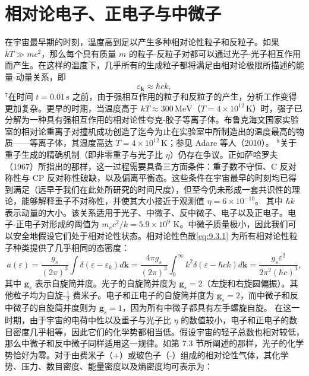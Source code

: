 \section{相对论电子、正电子与中微子}\label{ux76f8ux5bf9ux8bbaux7535ux5b50ux6b63ux7535ux5b50ux4e0eux4e2dux5faeux5b50}
在宇宙最早期的时刻，温度高到足以产生多种相对论性粒子和反粒子。如果 \(kT \gg mc^2\)，那么每个具有质量 \(m\) 的粒子-反粒子对都可以通过光子-光子相互作用而产生。在这样的温度下，几乎所有的生成粒子都将满足由相对论极限所描述的能量-动量关系，即
\begin{equation}\tag{9.3.1}\label{eq:9.3.1}
\varepsilon _ { \mathbf { k } } \approx \hbar c k ,
\end{equation}
\(^{7}\)在时间 \(t=0.01\,\mathrm{s}\) 之前，由于强相互作用的粒子和反粒子的产生，分析工作变得更加复杂。更早的时期，当温度高于 \(kT\approx300\,\mathrm{MeV}\)（\(T=4\times10^{12}\,\mathrm{K}\)）时，强子已分解为一种具有强相互作用的相对论性夸克-胶子等离子体。布鲁克海文国家实验室的相对论重离子对撞机成功创造了迄今为止在实验室中所制造出的温度最高的物质——等离子体，其温度高达 \(T=4\times10^{12}\,\mathrm{K}\)；参见 Adare 等人（2010）。
\(^{8}\)关于重子生成的精确机制（即非零重子与光子比 \(\eta\)）仍存在争议。正如萨哈罗夫（1967）所指出的那样，这一过程需要具备三方面条件：重子数不守恒、C 反对称性与 CP 反对称性破缺，以及偏离平衡态。这些条件在宇宙最早的时刻均已得到满足（远早于我们在此处所研究的时间尺度），但至今仍未形成一套共识性的理论，能够解释重子不对称性，并使其大小接近于观测值 \(\eta=6\times10^{-10}\)。
其中 \(\hbar k\) 表示动量的大小。该关系适用于光子、中微子、反中微子、电子以及正电子。电子-正电子对形成的阈值为 \(m_{e}c^{2}/k=5.9\times10^{9}\) K。中微子质量极小，因此我们可以安全地假设它们处于相对论性状态。相对论性色散\autoref{eq:9.3.1} 为所有相对论性粒子种类提供了几乎相同的态密度：
\begin{equation}\tag{9.3.2}\label{eq:9.3.2}
a ( \varepsilon ) = \frac { g _ { s } } { ( 2 \pi ) ^{3} } \int \delta ( \varepsilon - \varepsilon _ { k } ) d \mathbf { k } = \frac { 4 \pi g _ { s } } { ( 2 \pi ) ^{3} } \int _ { 0 } ^{\infty} k ^{2} \delta ( \varepsilon - \hbar c k ) d \mathbf { k } = \frac { g _ { s } \varepsilon ^{2} } { 2 \pi ^{2} ( \hbar c ) ^{3} } ,
\end{equation}
其中 \(\mathbf{g}_{s}\) 表示自旋简并度。光子的自旋简并度为 \(\mathbf{g}_{s}=2\)（左旋和右旋圆偏振）。其他粒子均为自旋-\(\frac{1}{2}\) 费米子。电子和正电子的自旋简并度为 \(\mathbf{g}_{s}=2\)，而中微子和反中微子的自旋简并度则为 \(\mathbf{g}_{s}=1\)，因为所有中微子都具有左手螺旋自旋。
在这一时期，由于宇宙的电荷中性以及重子与光子比 \(\eta\) 的数值较小，电子和正电子的数目密度几乎相等，因此它们的化学势都相当低。假设宇宙的轻子总数也相对较低，那么中微子和反中微子同样适用这一规律。如第 7.3 节所阐述的那样，光子的化学势恰好为零。对于由费米子（+）或玻色子（-）组成的相对论性气体，其化学势、压力、数目密度、能量密度以及熵密度均可表示为：
